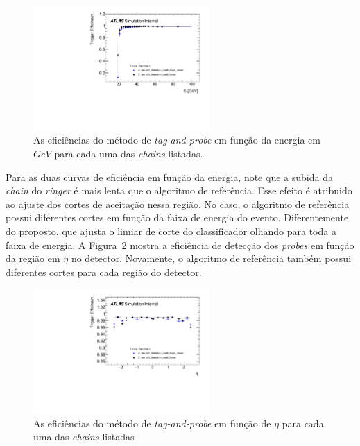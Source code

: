 \begin{figure}[h!t]
\centering
\includegraphics[width=0.6\textwidth]{figures/plots/plot_e24_lhmedium_hlt_eff_et_tap.pdf}
\caption[As eficiências do método de \textit{tag-and-probe} em função da energia em $GeV$.]{
As eficiências do método de \textit{tag-and-probe} em função da energia em $GeV$ para cada uma das \textit{chains} listadas.}
\label{fig:tap_et}
\end{figure}


Para as duas curvas de eficiência em função da energia, note que a subida da \textit{chain} do \textit{ringer} é mais lenta que o algoritmo de referência.
Esse efeito é atribuido ao ajuste dos cortes de aceitação nessa região. No caso, o algoritmo de referência possui diferentes cortes em função
da faixa de energia do evento. Diferentemente do proposto, que ajusta o limiar de corte do classificador olhando para toda
a faixa de energia.  A Figura~\ref{fig:tap_eta} mostra a eficiência de detecção dos \textit{probes} em função da região em $\eta$ no detector.  
Novamente, o algoritmo de referência também possui diferentes cortes para cada região do detector. 

\begin{figure}[h!t]
\centering
\includegraphics[width=0.6\textwidth]{figures/plots/plot_e24_lhmedium_hlt_eff_eta_tap.pdf}
\caption[As eficiências do método de \textit{tag-and-probe} em função de $\eta$.]{
As eficiências do método de \textit{tag-and-probe} em função de $\eta$ para cada uma das \textit{chains} listadas}
\label{fig:tap_eta}
\end{figure}

